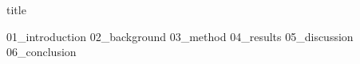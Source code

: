 \documentclass[12pt]{article}
\begin{document}
{title}

\frontmatter

\tableofcontents

\listoftables

\mainmatter

{01_introduction}
{02_background}
{03_method}
{04_results}
{05_discussion}
{06_conclusion}



\newpage
\printbibliography[heading = bibintoc, title = Bibliography]    %


\end{document}
